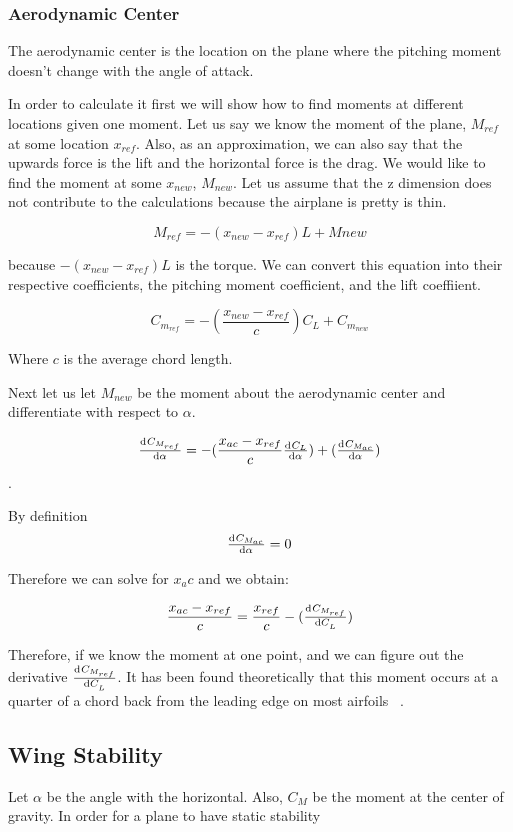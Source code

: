 \subsubsection{Aerodynamic Center}

The aerodynamic center is the location on the plane where the pitching moment doesn't
change with the angle of attack. 

In order to calculate it first we will show how to 
find moments at different locations given one moment. 
Let us say we know the moment of the plane, $M_{ref}$ at some
location $x_{ref}$. Also, as an approximation, we can also say that the upwards force
is the lift and the horizontal force is the drag. We would like to find the moment
at some $x_{new}$, $M_{new}$. Let us assume that the z dimension does not contribute to the
calculations because the airplane is pretty  is thin.

\[M_{ref} = -(x_{new} - x_{ref})L + M{new} \] 

because $-(x_{new} - x_{ref})L$ is the torque. We can convert this equation into their
respective coefficients, the pitching moment coefficient, and the lift coeffiient.

\[C_{m_{ref}} = - ( \frac{x_{new} - x_{ref}}{c})C_L + C_{m_{new}} \]

Where $c$ is the average chord length.

Next let us let $M_{new}$ be the moment about the aerodynamic center and
differentiate with respect to $\alpha$.

\[\od{C_{M_{ref}}}{\alpha} = - (\frac{x_{ac} - x_{ref}}{c}\od{C_L}{\alpha}) + (\od{C_{M_{ac}}}{\alpha})\].

By definition 
\[\od{C_{M_{ac}}}{\alpha} = 0\]

Therefore we can solve for $x_ac$ and we obtain:

\[\frac{x_{ac} - x_{ref}}{c} = \frac{x_{ref}}{c} - (\od{C_{M_{ref}}}{C_L})\]

Therefore, if we know the moment at one point, and we can figure out the derivative 
$\od{C_{M_{ref}}}{C_L}$. It has been found theoretically that this moment
occurs at a quarter of a chord back from the leading edge on most airfoils ~\cite{NASAac}.



\subsection{Wing Stability}
Let $\alpha$ be the angle with the horizontal. Also,
$C_M$ be the moment at the center of gravity.  In order for a plane to have static
stability


